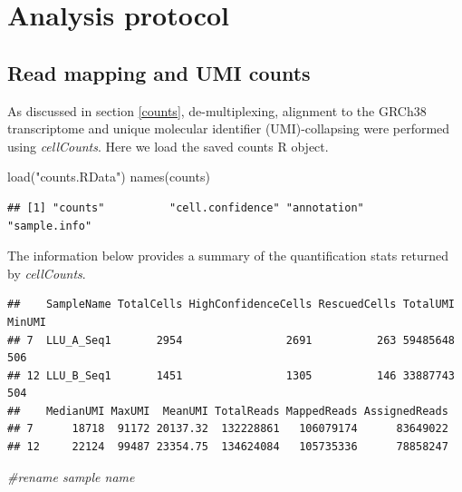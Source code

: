 \documentclass[
]{book}
\newenvironment{Shaded}{\begin{snugshade}}{\end{snugshade}}
\newcommand{\CommentTok}[1]{\textcolor[rgb]{0.56,0.35,0.01}{\textit{#1}}}
\newcommand{\FunctionTok}[1]{\textcolor[rgb]{0.00,0.00,0.00}{#1}}
\newcommand{\NormalTok}[1]{#1}
\newcommand{\SpecialCharTok}[1]{\textcolor[rgb]{0.00,0.00,0.00}{#1}}
\newcommand{\StringTok}[1]{\textcolor[rgb]{0.31,0.60,0.02}{#1}}
\begin{document}
\hypertarget{analysis-protocol}{%
\chapter{Analysis protocol}\label{analysis-protocol}}

\hypertarget{read-mapping-and-umi-counts}{%
\section{Read mapping and UMI counts}\label{read-mapping-and-umi-counts}}

As discussed in section \ref{counts}, de-multiplexing, alignment to the GRCh38 transcriptome and unique molecular identifier (UMI)-collapsing were performed using \emph{cellCounts}. Here we load the saved counts R object.

\begin{Shaded}
\begin{Highlighting}[]
\FunctionTok{load}\NormalTok{(}\StringTok{"counts.RData"}\NormalTok{)}
\FunctionTok{names}\NormalTok{(counts)}
\end{Highlighting}
\end{Shaded}

\begin{verbatim}
## [1] "counts"          "cell.confidence" "annotation"      "sample.info"
\end{verbatim}

The information below provides a summary of the quantification stats returned by \emph{cellCounts}.

\begin{Shaded}
\end{Shaded}

\begin{verbatim}
##    SampleName TotalCells HighConfidenceCells RescuedCells TotalUMI MinUMI
## 7  LLU_A_Seq1       2954                2691          263 59485648    506
## 12 LLU_B_Seq1       1451                1305          146 33887743    504
##    MedianUMI MaxUMI  MeanUMI TotalReads MappedReads AssignedReads
## 7      18718  91172 20137.32  132228861   106079174      83649022
## 12     22124  99487 23354.75  134624084   105735336      78858247
\end{verbatim}

\begin{Shaded}
\begin{Highlighting}[]
\CommentTok{\#rename sample name}
\end{Highlighting}
\end{Shaded}
\end{document}
